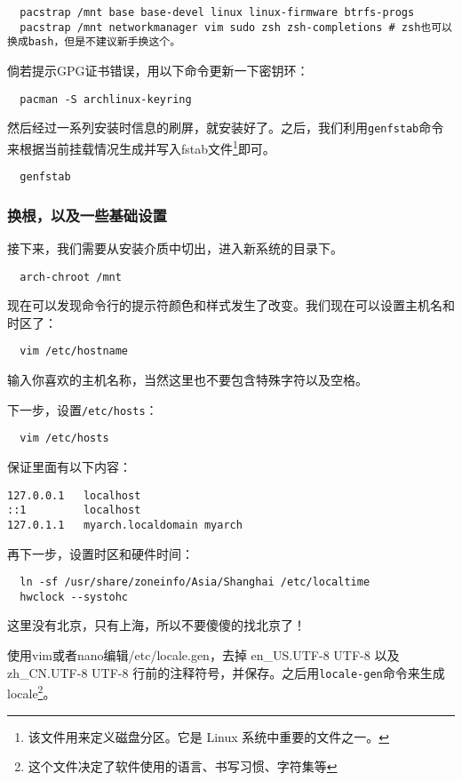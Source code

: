 \documentclass[../main.tex]{subfiles}
\begin{document}
\begin{lstlisting}
  pacstrap /mnt base base-devel linux linux-firmware btrfs-progs
  pacstrap /mnt networkmanager vim sudo zsh zsh-completions # zsh也可以换成bash，但是不建议新手换这个。
\end{lstlisting}

倘若提示GPG证书错误，用以下命令更新一下密钥环：

\begin{lstlisting}
  pacman -S archlinux-keyring
\end{lstlisting}

然后经过一系列安装时信息的刷屏，就安装好了。之后，我们利用\texttt{genfstab}命令来根据当前挂载情况生成并写入fstab文件\footnote{该文件用来定义磁盘分区。它是 Linux 系统中重要的文件之一。}即可。

\begin{lstlisting}
  genfstab
\end{lstlisting}

\subsubsection{换根，以及一些基础设置}

接下来，我们需要从安装介质中切出，进入新系统的目录下。

\begin{lstlisting}
  arch-chroot /mnt
\end{lstlisting}

现在可以发现命令行的提示符颜色和样式发生了改变。我们现在可以设置主机名和时区了：
\begin{lstlisting}
  vim /etc/hostname
\end{lstlisting}
输入你喜欢的主机名称，当然这里也不要包含特殊字符以及空格。

下一步，设置\texttt{/etc/hosts}：
\begin{lstlisting}
  vim /etc/hosts
\end{lstlisting}
保证里面有以下内容：
\begin{lstlisting}
127.0.0.1   localhost
::1         localhost
127.0.1.1   myarch.localdomain myarch
\end{lstlisting}

再下一步，设置时区和硬件时间：
\begin{lstlisting}
  ln -sf /usr/share/zoneinfo/Asia/Shanghai /etc/localtime
  hwclock --systohc
\end{lstlisting}
这里没有北京，只有上海，所以不要傻傻的找北京了！

使用vim或者nano编辑/etc/locale.gen，去掉 en\_US.UTF-8 UTF-8 以及 zh\_CN.UTF-8 UTF-8 行前的注释符号，并保存。之后用\texttt{locale-gen}命令来生成locale\footnote{这个文件决定了软件使用的语言、书写习惯、字符集等}。
\end{document}
